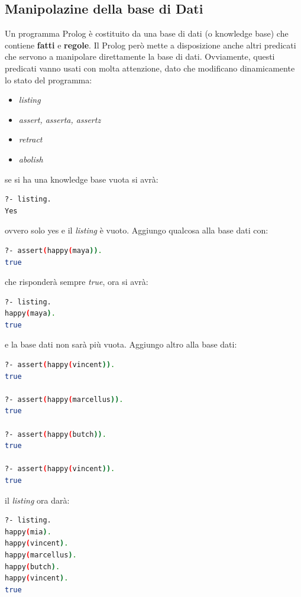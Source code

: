 \documentclass[a4paper,12pt, oneside]{book}
\begin{document}
\subsection{Manipolazine della base di Dati}
Un programma Prolog è costituito da una base di dati (o knowledge base) che contiene \textbf{fatti} e \textbf{regole}. Il Prolog però mette a disposizione anche altri predicati che servono a manipolare direttamente la base di dati. Ovviamente, questi predicati vanno usati con molta attenzione, dato che modificano dinamicamente lo stato del programma:
\begin{itemize}
	\item \textit{listing}
	\item \textit{assert, asserta, assertz}
	\item \textit{retract}
	\item \textit{abolish}
\end{itemize}
se si ha una knowledge base vuota si avrà:
\begin{shaded}
	\begin{lstlisting}[language=bash]
?- listing.
Yes
\end{lstlisting}
\end{shaded}
ovvero solo yes e il \textit{listing} è vuoto. Aggiungo qualcosa alla base dati con:
\begin{shaded}
	\begin{lstlisting}[language=bash]
?- assert(happy(maya)).
true
\end{lstlisting}
\end{shaded}
che risponderà sempre \textit{true}, ora si avrà:
\begin{shaded}
	\begin{lstlisting}[language=bash]
?- listing.
happy(maya).
true
\end{lstlisting}
\end{shaded}
e la base dati non sarà più vuota. Aggiungo altro alla base dati:
\begin{shaded}
	\begin{lstlisting}[language=bash]
?- assert(happy(vincent)).
true

?- assert(happy(marcellus)).
true

?- assert(happy(butch)).
true

?- assert(happy(vincent)).
true
\end{lstlisting}
\end{shaded}
il \textit{listing} ora darà:
\begin{shaded}
	\begin{lstlisting}[language=bash]
?- listing.
happy(mia).
happy(vincent).
happy(marcellus).
happy(butch).
happy(vincent).
true
\end{lstlisting}
\end{shaded}
\end{document}
